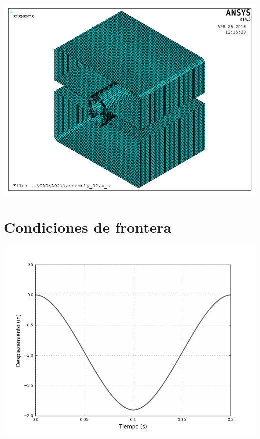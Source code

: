 \begin{center}
\includegraphics[scale=0.6]{src/ch3/mesh_assembly_02.png}
\label{fig:mesh_assembly02}
\end{center}

\section{Condiciones de frontera}

\begin{center}
\includegraphics[scale=0.6]{src/ch3/smooth_displacement.png}
\label{fig:smooth_displacement}
\end{center}





